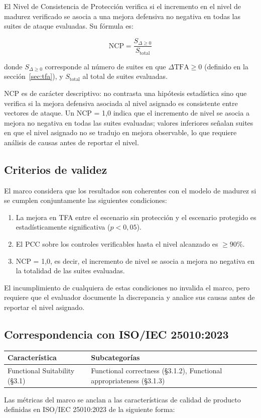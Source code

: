 El Nivel de Consistencia de Protección verifica si el incremento en el
nivel de madurez verificado se asocia a una mejora defensiva no negativa
en todas las suites de ataque evaluadas. Su fórmula es:

\[
  \text{NCP} = \frac{S_{\Delta \geq 0}}{S_{\text{total}}}
\]

donde $S_{\Delta \geq 0}$ corresponde al número de suites en que
$\Delta\text{TFA} \geq 0$ (definido en la sección~\ref{sec:tfa}), y
$S_{\text{total}}$ al total de suites evaluadas.

NCP es de carácter descriptivo: no contrasta una hipótesis estadística
sino que verifica si la mejora defensiva asociada al nivel asignado es
consistente entre vectores de ataque. Un NCP = 1{,}0 indica que el
incremento de nivel se asocia a mejora no negativa en todas las suites
evaluadas; valores inferiores señalan suites en que el nivel asignado
no se tradujo en mejora observable, lo que requiere análisis de causas
antes de reportar el nivel.

\subsection{Criterios de validez}

El marco considera que los resultados son coherentes con el modelo
de madurez si se cumplen conjuntamente las siguientes condiciones:

\begin{enumerate}[leftmargin=2em]
  \item La mejora en TFA entre el escenario sin protección y el
  escenario protegido es estadísticamente significativa ($p < 0{,}05$).
  \item El PCC sobre los controles verificables hasta el nivel
  alcanzado es $\geq 90\%$.
  \item NCP = 1{,}0, es decir, el incremento de nivel se asocia a
  mejora no negativa en la totalidad de las suites evaluadas.
\end{enumerate}

El incumplimiento de cualquiera de estas condiciones no invalida el
marco, pero requiere que el evaluador documente la discrepancia y
analice sus causas antes de reportar el nivel asignado.

\subsection{Correspondencia con ISO/IEC 25010:2023}

\begin{table}[H]
    \centering
    \renewcommand{\arraystretch}{1.4}
    \begin{tabular}{
      >{\raggedright\arraybackslash}p{4cm}
      >{\raggedright\arraybackslash}p{7.5cm}
    }
    \toprule
    \textbf{Característica} & \textbf{Subcategorías} \\
    \midrule
      Functional Suitability (\S3.1) &
      Functional correctness (\S3.1.2),
      Functional appropriateness (\S3.1.3) \\
    \bottomrule
    \end{tabular}
\end{table}

Las métricas del marco se anclan a las características de calidad de
producto definidas en ISO/IEC 25010:2023 de la siguiente forma: